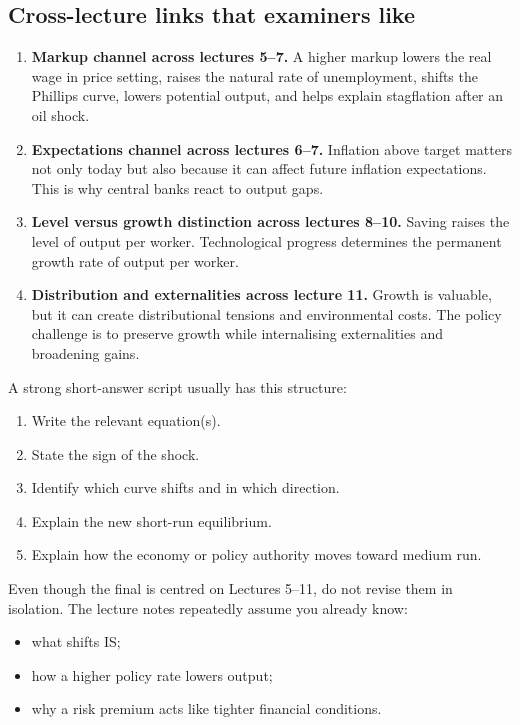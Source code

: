 \documentclass[12pt]{article}
\begin{document}
\subsection{Cross-lecture links that examiners like}

\begin{enumerate}[leftmargin=1.5em]
\item \textbf{Markup channel across lectures 5--7.}
A higher markup lowers the real wage in price setting, raises the natural rate of unemployment, shifts the Phillips curve, lowers potential output, and helps explain stagflation after an oil shock.

\item \textbf{Expectations channel across lectures 6--7.}
Inflation above target matters not only today but also because it can affect future inflation expectations. This is why central banks react to output gaps.

\item \textbf{Level versus growth distinction across lectures 8--10.}
Saving raises the level of output per worker. Technological progress determines the permanent growth rate of output per worker.

\item \textbf{Distribution and externalities across lecture 11.}
Growth is valuable, but it can create distributional tensions and environmental costs. The policy challenge is to preserve growth while internalising externalities and broadening gains.
\end{enumerate}

\begin{examtip}[title={Exam Focus: High priority for short-answer}]
A strong short-answer script usually has this structure:
\begin{enumerate}[leftmargin=1.5em]
\item Write the relevant equation(s).
\item State the sign of the shock.
\item Identify which curve shifts and in which direction.
\item Explain the new short-run equilibrium.
\item Explain how the economy or policy authority moves toward medium run.
\end{enumerate}
\end{examtip}

\begin{examtip}[title={Exam Focus: Background assumed from IS--LM}]
Even though the final is centred on Lectures 5--11, do not revise them in isolation. The lecture notes repeatedly assume you already know:
\begin{itemize}[leftmargin=1.5em]
\item what shifts IS;
\item how a higher policy rate lowers output;
\item why a risk premium acts like tighter financial conditions.
\end{itemize}
\end{examtip}
\end{document}
